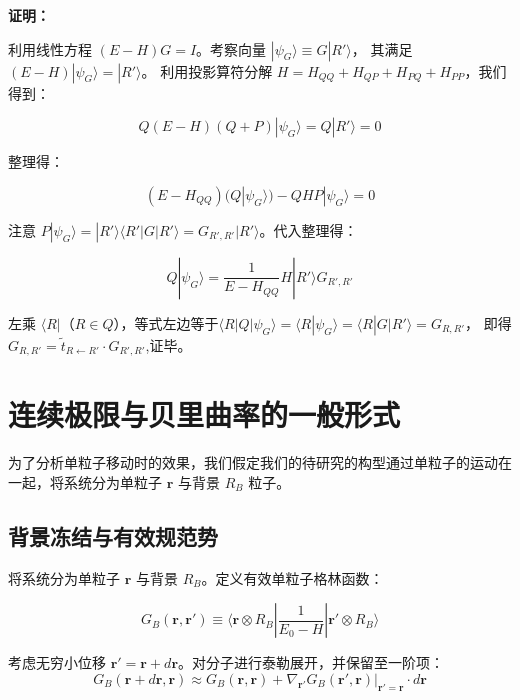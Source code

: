 \documentclass[a4paper,12pt]{article}
\begin{document}
\textbf{证明：}

利用线性方程 $(E - H)G = I$。考察向量 $|\psi_{G}\rangle \equiv G |R'\rangle$，
其满足 $(E - H) |\psi_{G}\rangle = |R'\rangle$。
利用投影算符分解 $H = H_{QQ} + H_{QP} + H_{PQ} + H_{PP}$，我们得到：

$$
Q(E - H)(Q+P) |\psi_{G}\rangle =  Q|R'\rangle = 0
$$

整理得：

\begin{equation}
    (E - H_{QQ}) (Q |\psi_{G}\rangle) - Q H P |\psi_{G}\rangle = 0
\end{equation}

注意 $P |\psi_{G}\rangle = |R'\rangle \langle R' | G | R' \rangle = G_{R', R'} |R'\rangle$。代入整理得：

\begin{equation}
    Q |\psi_{G}\rangle = \frac{1}{E - H_{QQ}} H |R'\rangle G_{R', R'}
\end{equation}

左乘 $\langle R|$（$R \in Q$），等式左边等于$\langle R|Q|\psi_{G}\rangle =\langle R|\psi_{G}\rangle 
= \langle R|{G}|R'\rangle = G_{R,R'}$，
即得 $G_{R,R'} = \tilde{t}_{R \leftarrow R'} \cdot G_{R', R'}$,证毕。


\section{连续极限与贝里曲率的一般形式}

为了分析单粒子移动时的效果，我们假定我们的待研究的构型通过单粒子的运动在一起，将系统分为单粒子 $\mathbf{r}$ 与背景 $R_B$ 粒子。


\subsection{背景冻结与有效规范势}
将系统分为单粒子 $\mathbf{r}$ 与背景 $R_B$。定义有效单粒子格林函数：

\begin{equation}
    G_B(\mathbf{r}, \mathbf{r}') \equiv \langle \mathbf{r} \otimes R_B | \frac{1}{E_0 - H} | \mathbf{r}' \otimes R_B \rangle
\end{equation}



考虑无穷小位移 $\mathbf{r}' = \mathbf{r} + d\mathbf{r}$。对分子进行泰勒展开，并保留至一阶项：
\begin{equation}
    G_B(\mathbf{r}+d\mathbf{r}, \mathbf{r}) \approx G_B(\mathbf{r}, \mathbf{r}) + \nabla_{\mathbf{r}'} G_B(\mathbf{r}', \mathbf{r})\big|_{\mathbf{r}'=\mathbf{r}} \cdot d\mathbf{r}
\end{equation}
\end{document}

